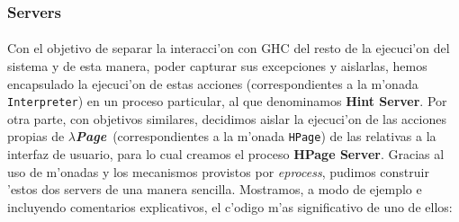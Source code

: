 \documentclass[a4paper]{article}
\newcommand{\hpage}{\textbf{\textsl{$\lambda$Page}}}
\begin{document}
\subsubsection{Servers}
\paragraph{}Con el objetivo de separar la interacci'on con GHC del resto de la ejecuci'on del sistema y de esta manera, poder capturar sus excepciones y aislarlas, hemos encapsulado la ejecuci'on de estas acciones (correspondientes a la m'onada \texttt{Interpreter}) en un proceso particular, al que denominamos \textbf{Hint Server}.  Por otra parte, con objetivos similares, decidimos aislar la ejecuci'on de las acciones propias de \hpage\ (correspondientes a la m'onada \texttt{HPage}) de las relativas a la interfaz de usuario, para lo cual creamos el proceso \textbf{HPage Server}.  Gracias al uso de m'onadas y los mecanismos provistos por \textsl{eprocess}, pudimos construir 'estos dos servers de una manera sencilla.   Mostramos, a modo de ejemplo e incluyendo comentarios explicativos, el c'odigo m'as significativo de uno de ellos:
\end{document}
